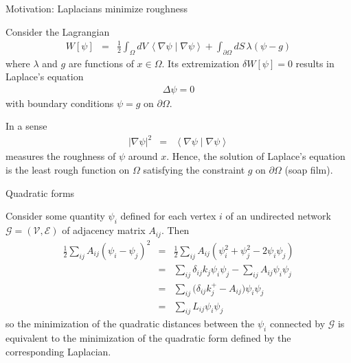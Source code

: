 \documentclass{beamer}
\newcommand{\braket}[2]{\left\langle #1 \middle| #2  \right\rangle}
\begin{document}

\begin{frame}{Motivation: Laplacians  minimize roughness}

Consider the Lagrangian
\begin{eqnarray}
W[\psi]
&=&
\frac{1}{2}
\int_{\Omega} dV\,
\braket{\nabla \psi}{\nabla \psi}
+
\int_{\partial \Omega} dS\,
\lambda(\psi-g)
\end{eqnarray}
where $\lambda$ and $g$ are functions of $x\in \Omega$.
Its extremization $\delta W[\psi]=0$ results in Laplace's equation 
\begin{eqnarray}
\label{Xeq11}
\Delta \psi = 0
\end{eqnarray}
with boundary conditions $\psi = g$ on $\partial \Omega$.

\vspace{0.25cm}

In a sense
\begin{eqnarray}
\left| \nabla \psi \right|^2
&=&
\braket{\nabla \psi}{\nabla \psi}
\end{eqnarray}
measures the roughness of $\psi$ around $x$.
Hence, the solution of Laplace's equation is the least rough function on $\Omega$ satisfying the constraint $g$ on $\partial \Omega$ (soap film).

\end{frame}


\begin{frame}{Quadratic forms}

Consider some quantity $\psi_i$ defined for each vertex $i$ of an undirected network $\mathcal{G}=(\mathcal{V},\mathcal{E})$ of adjacency matrix $A_{ij}$.
Then
\begin{eqnarray}
\frac{1}{2}
\sum_{ij}
A_{ij}
(\psi_i-\psi_j)^2
&=&
\frac{1}{2}
\sum_{ij}
A_{ij}
(\psi_i^2+\psi_j^2-2\psi_i\psi_j)
\\
&=&
\sum_{ij}
\delta_{ij} k_j 
\psi_i \psi_j
-
\sum_{ij}
A_{ij}
\psi_i \psi_j
\nonumber
\\
&=&
\sum_{ij}
\big(
\delta_{ij} 
k^+_j
-
A_{ij}
\big)
\psi_i \psi_j
\nonumber
\\
&=&
\sum_{ij}
L_{ij}
\psi_i \psi_j
\nonumber
\end{eqnarray}
so the minimization of the quadratic distances between the $\psi_i$ connected by $\mathcal{G}$ is equivalent to the minimization of the quadratic form defined by the corresponding Laplacian.

\end{frame}
\end{document}
